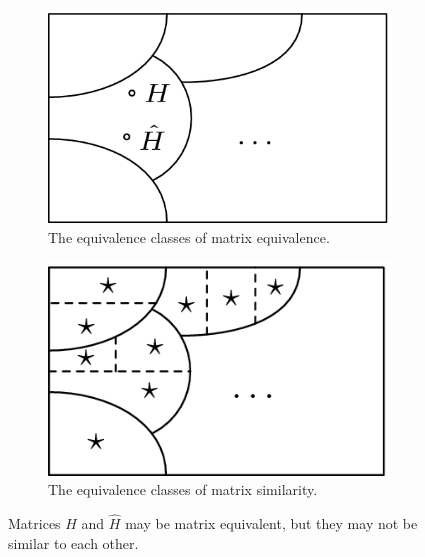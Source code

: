 \documentclass{article}
\begin{document}
        \begin{figure}[H]
            \centering
            \begin{subfigure}{0.45\textwidth}
                \centering
                \includegraphics[scale = .35]{sp23/hw-supplements/hw5-supp/images/linalg_matrix_equivalence_classes.png}
                \caption{The equivalence classes of matrix equivalence.}
            \end{subfigure}
            \begin{subfigure}{0.45\textwidth}
                \centering
                \includegraphics[scale = .41]{sp23/hw-supplements/hw5-supp/images/linalg_matrix_similarity_equiv_classes.png}
                \caption{The equivalence classes of matrix similarity.}
            \end{subfigure}
            \caption{Matrices $H$ and $\hat{H}$ may be matrix equivalent, but they may not be similar to each other.}
            \label{fig:3}
        \end{figure}
\end{document}
